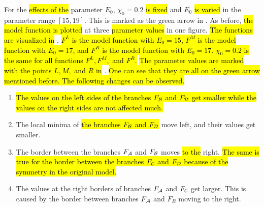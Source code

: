 For the \hl{effects of the} parameter $E_0$, $\chi_0 = 0.2$ \hl{is fixed} and $E_0$ \hl{is varied} in the parameter range $[15, 19]$.
This is marked as the green arrow in .
As before, \hl{the model function is plotted} at three \hl{parameter values} in one figure.
\hl{The functions are visualized in} .
\hl{
	$F^L$ is the model function with $E_0 = 15$, $F^M$ is the model function with $E_0 = 17$, and $F^R$ is the model function with $E_0 = 17$.
	$\chi_0 = 0.2$ is the same for all functions $F^L, F^M,$ and $F^R$.
}
\hl{The parameter values are marked with the points $L, M,$ and $R$ in} .
\hl{
	One can see that they are all on the green arrow mentioned before.
	The following changes can be observed.
}
\begin{enumerate}
	\item \hl{
		      The values on the left sides of the branches $F_{\mathcal{B}}$ and $F_{\mathcal{D}}$ get smaller while the values on the right sides are not affected much.
	      }
	\item The local minima of \hl{the branches $F_{\mathcal{B}}$ and $F_{\mathcal{D}}$} move left, and their values get smaller.
	\item The border between the branches $F_{\mathcal{A}}$ and $F_{\mathcal{B}}$ moves \hl{to the} right.
	      \hl{
		      The same is true for the border between the branches $F_{\mathcal{C}}$ and $F_{\mathcal{D}}$ because of the symmetry in the original model.
	      }
	\item The values at the right borders of branches $F_{\mathcal{A}}$ and $F_{\mathcal{C}}$ get larger. This is caused by the border between branches $F_{\mathcal{A}}$ and $F_B$ moving to the right.
\end{enumerate}

